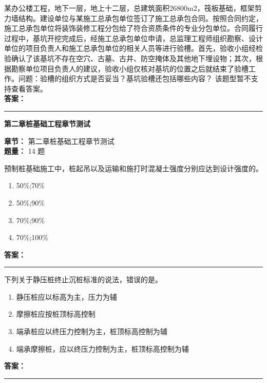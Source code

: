 \documentclass[UTF8,fontset=fandol,11pt]{ctexart}
\newcommand{\chaptertitle}[1]{\vspace{0.5em}\begin{tcolorbox}[enhanced,colback=deepblue,colframe=deepblue,arc=2mm,boxrule=0pt]\begin{center}\Large\bfseries\color{white}#1\end{center}\end{tcolorbox}\vspace{0.5em}}
\newcommand{\answerline}{\textcolor{answerred}{\rule{2.4cm}{0.7pt}}}
\begin{document}
\begin{quizbox}[title={第 35 题}]
某办公楼工程，地下一层，地上十二层，总建筑面积26800m2，筏板基础，框架剪力墙结构。建设单位与某施工总承包单位签订了施工总承包合同。按照合同约定，施工总承包单位将装饰装修工程分包给了符合资质条件的专业分包单位。合同履行过程中，基坑开挖完成后，经施工总承包单位申请，总监理工程师组织勘察、设计单位的项目负责人和施工总承包单位的相关人员等进行验槽。首先，验收小组经检验确认了该基坑不存在空穴、古墓、古井、防空掩体及其他地下埋设物；其次，根据勘察单位项目负责人的建议，验收小组仅核对基坑的位置之后就结束了验槽工作。问题：验槽的组织方式是否妥当？基坑验槽还包括哪些内容？ 该题型暂不支持查看答案。\\
\textbf{\textcolor{answerred}{答案：}} \answerline
\end{quizbox}

\chaptertitle{第二章桩基础工程章节测试}
\begin{mainbox}
\textbf{\textcolor{mainblue}{章节：}} 第二章桩基础工程章节测试\\
\textbf{\textcolor{answerred}{题量：}} 14 题
\end{mainbox}

\begin{quizbox}[title={第 1 题}]
预制桩基础施工中，桩起吊以及运输和施打时混凝土强度分别应达到设计强度的。\\
\begin{enumerate}[label=\Alph*.]
\item 50\%;70\%
\item 50\%;90\%
\item 70\%;90\%
\item 70\%;100\%
\end{enumerate}
\textbf{\textcolor{answerred}{答案：}} \answerline
\end{quizbox}

\begin{quizbox}[title={第 2 题}]
下列关于静压桩终止沉桩标准的说法，错误的是。\\
\begin{enumerate}[label=\Alph*.]
\item 静压桩应以标高为主，压力为辅
\item 摩擦桩应按桩顶标高控制
\item 端承桩应以终压力控制为主，桩顶标高控制为辅
\item 端承摩擦桩，应以终压力控制为主，桩顶标高控制为辅
\end{enumerate}
\textbf{\textcolor{answerred}{答案：}} \answerline
\end{quizbox}
\end{document}
